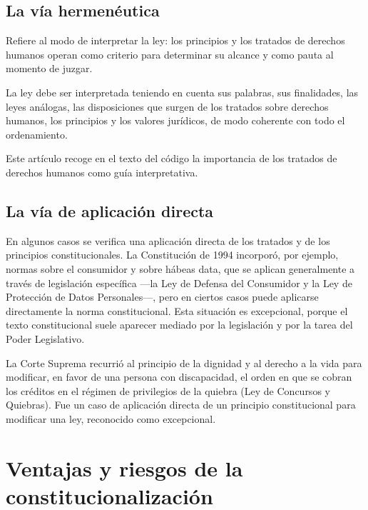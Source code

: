 \documentclass[12pt,oneside]{book}
\begin{document}
\subsection{La vía hermenéutica}

Refiere al modo de interpretar la ley: los principios y los tratados de derechos humanos operan como criterio para determinar su alcance y como pauta al momento de juzgar.

\begin{regla}
La ley debe ser interpretada teniendo en cuenta sus palabras, sus finalidades, las leyes análogas, las disposiciones que surgen de los tratados sobre derechos humanos, los principios y los valores jurídicos, de modo coherente con todo el ordenamiento.
\end{regla}

Este artículo recoge en el texto del código la importancia de los tratados de derechos humanos como guía interpretativa.

\subsection{La vía de aplicación directa}

En algunos casos se verifica una aplicación directa de los tratados y de los principios constitucionales. La Constitución de 1994 incorporó, por ejemplo, normas sobre el consumidor y sobre hábeas data, que se aplican generalmente a través de legislación específica ---la Ley de Defensa del Consumidor y la Ley de Protección de Datos Personales---, pero en ciertos casos puede aplicarse directamente la norma constitucional. Esta situación es excepcional, porque el texto constitucional suele aparecer mediado por la legislación y por la tarea del Poder Legislativo.

\begin{ejemplo}
La Corte Suprema recurrió al principio de la dignidad y al derecho a la vida para modificar, en favor de una persona con discapacidad, el orden en que se cobran los créditos en el régimen de privilegios de la quiebra (Ley de Concursos y Quiebras). Fue un caso de aplicación directa de un principio constitucional para modificar una ley, reconocido como excepcional.
\end{ejemplo}

\section{Ventajas y riesgos de la constitucionalización}
\end{document}
